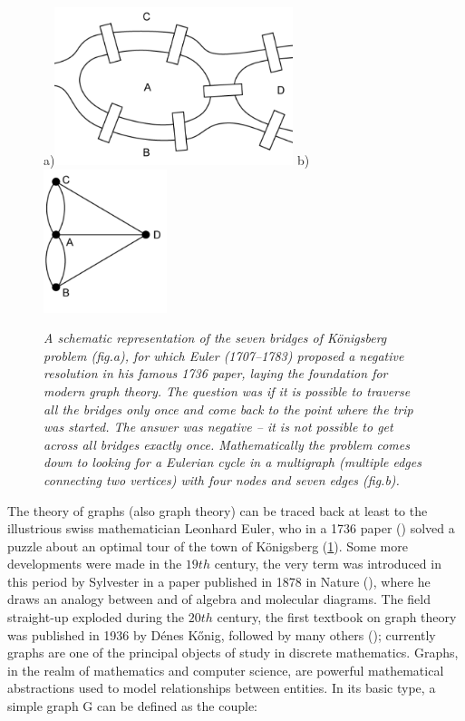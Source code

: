 \documentclass[binding=0.6cm]{sapthesis}
\newcommand{\mycite}[1]{(\cite{#1})}
\begin{document}
\begin{figure}
    \centering
    \footnotesize a)\includegraphics[width=0.62\textwidth]{imgs/background/euler-bridges-01.png}
    \footnotesize b)\includegraphics[width=0.32\textwidth]{imgs/background/euler-bridges-03.png}
    \caption{\textit{A schematic representation of the seven bridges of Königsberg problem (fig.a), for which Euler (1707–1783) proposed a negative resolution in his famous 1736 paper, laying the foundation for modern graph theory. The question was if it is possible to traverse all the bridges only once and come back to the point where the trip was started. The answer was negative – it is not possible to get across all bridges exactly once. Mathematically the problem comes down to looking for a Eulerian cycle in a multigraph (multiple edges connecting two vertices) with four nodes and seven edges (fig.b).}}
    \label{fig:bg.gnn.konigsbridge}
\end{figure}
The theory of graphs (also graph theory) can be traced back at least to the illustrious swiss mathematician Leonhard Euler, who in a 1736 paper \mycite{gazette_1987} solved a puzzle about an optimal tour of the town of Königsberg (\cref{fig:bg.gnn.konigsbridge}). Some more developments were made in the $19th$ century, the very term  was introduced in this period by Sylvester in a paper published in 1878 in Nature \mycite{Sylvester1878ChemistryAA}, where he draws an analogy between  and  of algebra and molecular diagrams. The field straight-up exploded during the $20th$ century, the first textbook on graph theory was published in 1936 by Dénes Kőnig, followed by many others \mycite{tutte2001graph}; currently graphs are one of the principal objects of study in discrete mathematics. Graphs, in the realm of mathematics and computer science, are powerful mathematical abstractions used to model relationships between entities. In its basic type, a simple graph G can be defined as the couple:
\end{document}
